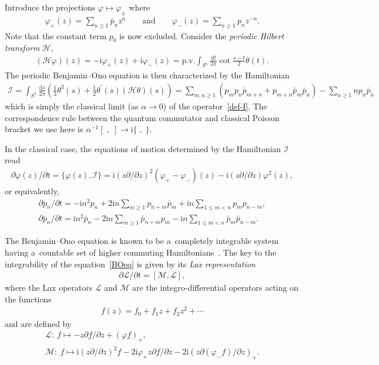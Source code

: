 \documentclass[pdftex]{sigma}
\numberwithin{equation}{section}
\renewcommand\ge{\geqslant}
\renewcommand\le{\leqslant}
\begin{document}
Introduce the projections $\varphi\mapsto\varphi_\pm$ where
\begin{gather*}
\varphi_+(z)=\sum_{n\ge1}\bar{p}_nz^n
\qquad
\text{and}
\qquad
\varphi_-(z)=\sum_{n\ge1}p_nz^{-n}.
\end{gather*}
Note that the constant term $p_0$ is now excluded.
Consider the \emph{periodic Hilbert transform} $\mathcal H$,
\begin{gather*}
(\mathcal H\varphi)(z)=-\mathrm{i}\varphi_+(z)+\mathrm{i}\varphi_-(z)=\text{p.v.}\int_{S^1}
\frac{\mathrm{d}t}{2\pi}\cot\frac{s-t}{2}
\theta(t).
\end{gather*}
The periodic Benjamin--Ono equation is then characterized by the Hamiltonian
\begin{gather*}
\mathcal I=\int_{S^1}\frac{\mathrm{d}s}{2\pi}\left(\frac13\theta^{3}(s)+\frac{1}{2}
\theta^{\prime}(s)(\mathcal H\theta)(s)\right)
=\sum_{m,n\ge1}
(p_mp_n\bar{p}_{m+n}+p_{m+n}\bar{p}_m\bar{p}_n)-\sum_{n\ge1}np_n\bar{p}_n
\end{gather*}
which is simply the classical limit (as $\alpha\rightarrow0$) of the operator~\eqref{def-I}.
The correspondence rule between the quantum commutator and classical Poisson bracket we use here is
$\alpha^{-1}[\;,\; ]\to\mathrm{i}\{\;,\;\}$.

In the classical case, the equations of motion determined by the Hamiltonian $\mathcal I$ read
\begin{gather}
\label{BOeq}
\partial\varphi(z)/\partial t=\{\varphi(z)
,\mathcal I\}=\mathrm{i}(z\partial /\partial
z)^2(\varphi_+-\varphi_-)(z)-\mathrm{i}(z\partial /\partial z)\varphi^2(z),
\end{gather}
or equivalently,
\begin{gather}
\label{eqmo-p}
\partial p_n/\partial t=-\mathrm{i}n^2p_n+2\mathrm{i}n\sum_{m\ge1}p_{n+m}\bar{p}_m+\mathrm{i}n\sum_{1\le m<n}p_mp_{n-m},
\\
\label{eqmo-pp}
\partial \bar{p}_n/\partial t=
\mathrm{i}n^2\bar{p}_n-2\mathrm{i}n\sum_{m\ge1}\bar{p}_{n+m}{p_m}-\mathrm{i}n\sum_{1\le m<n}\bar{p}_m\bar{p}_{n-m}.
\end{gather}

The Benjamin--Ono equation is known to be a~completely integrable system having a~coun\-tab\-le set of higher
commuting Hamiltonians~\cite{AFSS,KLM,KM}.
The key to the integrability of the equation~\eqref{BOeq} is given by its {\it Lax representation}
\begin{gather}
\label{lax-pair-eq}
\partial \mathcal L/\partial t=[\mathcal M,\mathcal L],
\end{gather}
where the Lax operators $\mathcal L$ and $\mathcal M$ are the integro-dif\/ferential operators acting on
the functions
\begin{gather*}
f(z)=f_0+f_1z+f_2z^2+\cdots
\end{gather*}
and are def\/ined by
\begin{gather*}
\mathcal L:\ f\mapsto-z\partial f/\partial z+(\varphi f)_{+},
\\
\mathcal M:\ f\mapsto\mathrm{i}(z\partial /\partial z)^2f-2\mathrm{i}
\varphi_+z\partial f/\partial z-2\mathrm{i}
(z\partial (\varphi_-f)/\partial z)_{+}.
\end{gather*}
\end{document}
